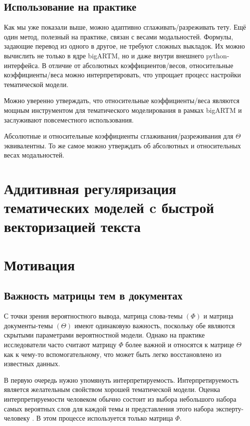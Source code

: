 \subsection{Использование на практике} 

Как мы уже показали выше, можно адаптивно сглаживать/разреживать тету. Ещё один метод, полезный на практике, связан с весами модальностей.  Формулы, задающие перевод из одного в другое, не требуют сложных выкладок. Их можно вычислить не только в ядре bigARTM, но и даже внутри внешнего python-интерфейса.  В отличие от абсолютных коэффициентов/весов,  относительные коэффициенты/веса можно интерпретировать, что упрощает процесс настройки тематической модели.  

Можно уверенно утверждать, что относительные коэффициенты/веса являются мощным инструментом для тематического моделирования в рамках bigARTM и заслуживают повсеместного использования.  

Абсолютные и относительные коэффициенты сглаживания/разреживания для $\Theta$ эквивалентны. То же самое можно утверждать об абсолютных и относительных весах модальностей.  

\section{Аддитивная регуляризация тематических моделей c быстрой векторизацией текста} 

\section{Мотивация} 

\subsection{Важность матрицы тем в документах} 

С точки зрения вероятностного вывода, матрица слова-темы $(\Phi)$ и матрица документы-темы $(\Theta)$ имеют одинаковую важность, поскольку обе являются скрытыми параметрами вероятностной модели. Однако на практике исследователи часто считают матрицу $\Phi$ более важной и относятся к матрице $\Theta$ как к чему-то вспомогательному, что может быть легко восстановлено из известных данных.  

В первую очередь нужно упомянуть интерпретируемость. Интерпретируемость является желательным свойством хорошей тематической модели. Оценка интерпретируемости человеком обычно состоит из выбора небольшого набора самых вероятных слов для каждой темы и представления этого набора эксперту-человеку \cite{roder2015exploring}. В этом процессе используется только матрица $\Phi$.  

